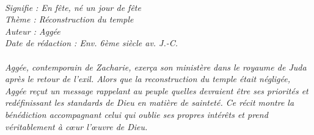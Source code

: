 \BFont
\noindent\hrulefill
\textit{
\bigskip
{\centering{}
\\Signifie : En fête, né un jour de fête
\\Thème : Réconstruction du temple
\\Auteur : Aggée
\\Date de rédaction : Env. 6ème siècle av. J.-C.\\}
}
\textit{
\\Aggée, contemporain de Zacharie, exerça son ministère dans le royaume de Juda après le retour de l’exil. Alors que la reconstruction du temple était négligée, Aggée reçut un message rappelant au peuple quelles devraient être ses priorités et redéfinissant les standards de Dieu en matière de sainteté. Ce récit montre la bénédiction accompagnant celui qui oublie ses propres intérêts et prend véritablement à cœur l’œuvre de Dieu.\bigskip
}
\par\nobreak\noindent\hrulefill
